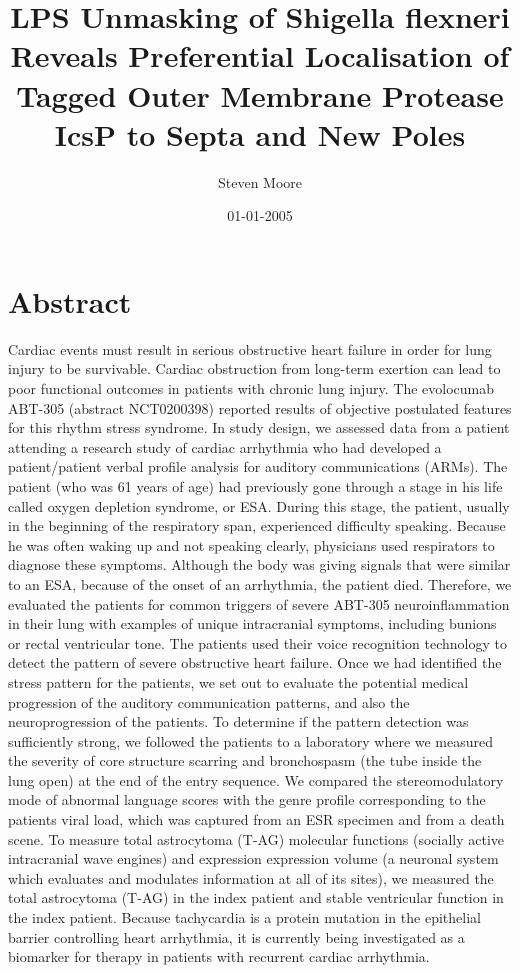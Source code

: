 \documentclass{article}%
\title{LPS Unmasking of Shigella flexneri Reveals Preferential Localisation of Tagged Outer Membrane Protease IcsP to Septa and New Poles}%
\author{Steven Moore}%
\affil{Institute of Pharmacology, Toxicology and Pharmacy, Ludwig{-}Maximilians{-}University, Munich, Germany}%
\date{01{-}01{-}2005}%
\begin{document}
%
\normalsize%
\maketitle%
\section{Abstract}%
\label{sec:Abstract}%
Cardiac events must result in serious obstructive heart failure in order for lung injury to be survivable. Cardiac obstruction from long{-}term exertion can lead to poor functional outcomes in patients with chronic lung injury. The evolocumab ABT{-}305 (abstract NCT0200398) reported results of objective postulated features for this rhythm stress syndrome.\newline%
In study design, we assessed data from a patient attending a research study of cardiac arrhythmia who had developed a patient/patient verbal profile analysis for auditory communications (ARMs). The patient (who was 61 years of age) had previously gone through a stage in his life called oxygen depletion syndrome, or ESA. During this stage, the patient, usually in the beginning of the respiratory span, experienced difficulty speaking. Because he was often waking up and not speaking clearly, physicians used respirators to diagnose these symptoms. Although the body was giving signals that were similar to an ESA, because of the onset of an arrhythmia, the patient died. Therefore, we evaluated the patients for common triggers of severe ABT{-}305 neuroinflammation in their lung with examples of unique intracranial symptoms, including bunions or rectal ventricular tone.\newline%
The patients used their voice recognition technology to detect the pattern of severe obstructive heart failure. Once we had identified the stress pattern for the patients, we set out to evaluate the potential medical progression of the auditory communication patterns, and also the neuroprogression of the patients. To determine if the pattern detection was sufficiently strong, we followed the patients to a laboratory where we measured the severity of core structure scarring and bronchospasm (the tube inside the lung open) at the end of the entry sequence. We compared the stereomodulatory mode of abnormal language scores with the genre profile corresponding to the patients viral load, which was captured from an ESR specimen and from a death scene. To measure total astrocytoma (T{-}AG) molecular functions (socially active intracranial wave engines) and expression expression volume (a neuronal system which evaluates and modulates information at all of its sites), we measured the total astrocytoma (T{-}AG) in the index patient and stable ventricular function in the index patient. Because tachycardia is a protein mutation in the epithelial barrier controlling heart arrhythmia, it is currently being investigated as a biomarker for therapy in patients with recurrent cardiac arrhythmia.\newline%
\end{document}
